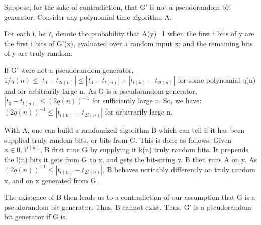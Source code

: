 \documentclass[10pt]{article}
\begin{document}
Suppose, for the sake of contradiction, that G' is not a pseudorandom bit generator. Consider any polynomial time algorithm A.

For each i, let $t_{i}$ denote the probability that A(y)=1 when the first i bits of y are the first i bits of G'(x), evaluated over a random input x; and the remaining bits of y are truly random.

If G' were not a pseudorandom generator, $1/q(n) \leq |t_{0} - t_{2l(n)}| \leq |t_{0} - t_{l(n)}| + |t_{l(n)} - t_{2l(n)}|$ for some polynomial q(n) and for arbitrarily large n. As G is a pseudorandom generator, $|t_{0} - t_{l(n)}| \leq (2q(n))^{-1}$ for sufficiently large n. So, we have: $(2q(n))^{-1} \leq |t_{l(n)} - t_{2l(n)}|$ for arbitrarily large n.

With A, one can build a randomized algorithm B which can tell if it has been supplied truly random bits, or bits from G. This is done as follows: Given $x \in {0, 1}^{l(n)}$, B first runs G by supplying it k(n) truly random bits. It prepends the l(n) bits it gets from G to x, and gets the bit-string y. B then runs A on y. As $(2q(n))^{-1} \leq |t_{l(n)} - t_{2l(n)}|$, B behaves noticably differently on truly random x, and on x generated from G.

The existence of B then leads us to a contradiction of our assumption that G is a pseudorandom bit generator. Thus, B cannot exist. Thus, G' is a pseudorandom bit generator if G is.

% 
% 
\end{document}
